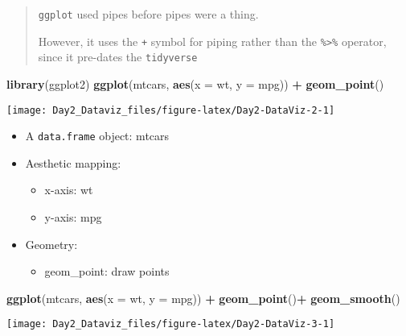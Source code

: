 \documentclass[12pt,letterpaperpaper,openany]{book}
\newenvironment{Shaded}{\begin{snugshade}}{\end{snugshade}}
\newcommand{\DataTypeTok}[1]{\textcolor[rgb]{0.13,0.29,0.53}{#1}}
\newcommand{\KeywordTok}[1]{\textcolor[rgb]{0.13,0.29,0.53}{\textbf{#1}}}
\newcommand{\NormalTok}[1]{#1}
\newcommand{\OperatorTok}[1]{\textcolor[rgb]{0.81,0.36,0.00}{\textbf{#1}}}
\newcommand{\StringTok}[1]{\textcolor[rgb]{0.31,0.60,0.02}{#1}}
\providecommand{\tightlist}{%
  \setlength{\itemsep}{0pt}\setlength{\parskip}{0pt}}
\begin{document}
\begin{quote}
\texttt{ggplot} used pipes before pipes were a thing.

However, it uses the \texttt{+} symbol for
piping rather than the \texttt{\%\textgreater{}\%} operator, since it pre-dates the \texttt{tidyverse}
\end{quote}

\begin{Shaded}
\begin{Highlighting}[]
\KeywordTok{library}\NormalTok{(ggplot2)}
\KeywordTok{ggplot}\NormalTok{(mtcars, }\KeywordTok{aes}\NormalTok{(}\DataTypeTok{x =}\NormalTok{ wt, }\DataTypeTok{y =}\NormalTok{ mpg)) }\OperatorTok{+}\StringTok{ }\KeywordTok{geom_point}\NormalTok{()}
\end{Highlighting}
\end{Shaded}

\texttt{[image: Day2\_Dataviz\_files/figure-latex/Day2-DataViz-2-1]}

\begin{itemize}
\tightlist
\item
  A \texttt{data.frame} object: mtcars
\item
  Aesthetic mapping:

  \begin{itemize}
  \tightlist
  \item
    x-axis: wt
  \item
    y-axis: mpg
  \end{itemize}
\item
  Geometry:

  \begin{itemize}
  \tightlist
  \item
    geom\_point: draw points
  \end{itemize}
\end{itemize}

\begin{Shaded}
\begin{Highlighting}[]
\KeywordTok{ggplot}\NormalTok{(mtcars, }\KeywordTok{aes}\NormalTok{(}\DataTypeTok{x =}\NormalTok{ wt, }\DataTypeTok{y =}\NormalTok{ mpg)) }\OperatorTok{+}\StringTok{ }
\StringTok{  }\KeywordTok{geom_point}\NormalTok{()}\OperatorTok{+}\StringTok{ }
\StringTok{  }\KeywordTok{geom_smooth}\NormalTok{()}
\end{Highlighting}
\end{Shaded}

\texttt{[image: Day2\_Dataviz\_files/figure-latex/Day2-DataViz-3-1]}
\end{document}
